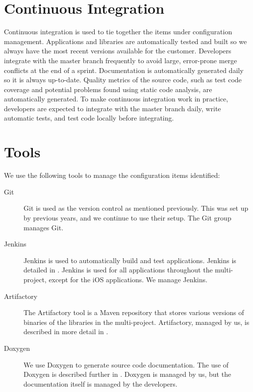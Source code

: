 \section{Continuous Integration}\label{sec:SCM_ci}
Continuous integration is used to tie together the items under configuration management. Applications and libraries are automatically tested and built so we always have the most recent versions available for the customer. Developers integrate with the master branch frequently to avoid large, error-prone merge conflicts at the end of a sprint. Documentation is automatically generated daily so it is always up-to-date. Quality metrics of the source code, such as test code coverage and potential problems found using static code analysis, are automatically generated. To make continuous integration work in practice, developers are expected to integrate with the master branch daily, write automatic tests, and test code locally before integrating.

\section{Tools}\label{sec:SCM_tools}
We use the following tools to manage the configuration items identified:

\begin{description}
  \item[Git] Git is used as the version control as mentioned previously. This was set up by previous years, and we continue to use their setup. The Git group manages Git.
  \item[Jenkins] Jenkins is used to automatically build and test applications. Jenkins is detailed in . Jenkins is used for all applications throughout the multi-project, except for the iOS applications. We manage Jenkins.
  \item[Artifactory] The Artifactory tool is a Maven repository that stores various versions of binaries of the libraries in the multi-project. Artifactory, managed by us, is described in more detail in .
  \item[Doxygen] We use Doxygen to generate source code documentation. The use of Doxygen is described further in . Doxygen is managed by us, but the documentation itself is managed by the developers.
\end{description}